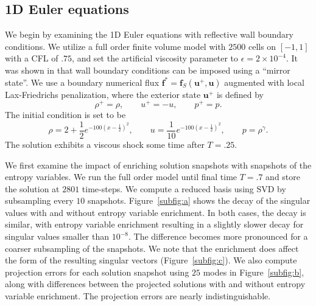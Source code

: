 \documentclass[preprint,10pt]{elsarticle}
\theoremstyle{definition}
\theoremstyle{lemma}
\theoremstyle{theorem}
\theoremstyle{assumption}
\newcommand{\LRp}[1]{\left( #1 \right)}
\begin{document}
\subsection{1D Euler equations}

We begin by examining the 1D Euler equations with reflective wall boundary conditions.  We utilize a full order finite volume model with $2500$ cells on $[-1,1]$ with a CFL of $.75$, and set the artificial viscosity parameter to $\epsilon = 2\times 10^{-4}$.   It was shown in \cite{svard2014entropy, chen2017entropy} that wall boundary conditions can be imposed using a ``mirror state''.  We use a boundary numerical flux $\bm{f}^* = \bm{f}_S\LRp{\bm{u}^+,\bm{u}}$ augmented with local Lax-Friedrichs penalization, where the exterior state $\bm{u}^+$ is defined by
\[
\rho^+ = \rho, \qquad {u}^+ = -u, \qquad p^+ = p.  
\]  The initial condition is set to be 
\[
\rho = 2 + \frac{1}{2}e^{-100\LRp{x-\frac{1}{2}}^2}, \qquad 
    u = \frac{1}{10}e^{-100\LRp{x-\frac{1}{2}}^2}, \qquad p = \rho^{\gamma}.
\]
The solution exhibits a viscous shock some time after $T=.25$.  

We first examine the impact of enriching solution snapshots with snapshots of the entropy variables.  We run the full order model until final time $T=.7$ and store the solution at $2801$ time-steps.  We compute a reduced basis using SVD by subsampling every $10$ snapshots.  Figure~\ref{subfig:a} shows the decay of the singular values with and without entropy variable enrichment.  In both cases, the decay is similar, with entropy variable enrichment resulting in a slightly slower decay for singular values smaller than $10^{-8}$.  The difference becomes more pronounced for a coarser subsampling of the snapshots.  We note that the enrichment does affect the form of the resulting singular vectors (Figure~\ref{subfig:c}).  We also compute projection errors for each solution snapshot using $25$ modes in Figure~\ref{subfig:b}, along with differences between the projected solutions with and without entropy variable enrichment.  The projection errors are nearly indistinguishable.  %
\end{document}
